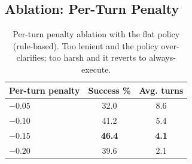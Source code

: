 \subsection{Ablation: Per-Turn Penalty}

\begin{table}[t]
\centering
\small
\begin{tabular}{lcc}
\toprule
\textbf{Per-turn penalty} & \textbf{Success \%} & \textbf{Avg. turns} \\
\midrule
$-0.05$ & 32.0 & 8.6 \\
$-0.10$ & 41.2 & 5.4 \\
$\mathbf{-0.15}$ & \textbf{46.4} & \textbf{4.1} \\
$-0.20$ & 39.6 & 2.1 \\
\bottomrule
\end{tabular}
\caption{Per-turn penalty ablation with the flat policy (rule-based). Too lenient and the policy over-clarifies; too harsh and it reverts to always-execute.}
\label{tab:ablation}
\end{table}
